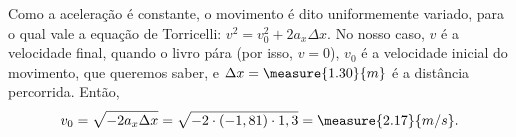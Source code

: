 \begin{question}
\begin{solution}
		Como a aceleração é constante, o movimento é dito uniformemente variado, para o qual vale a equação de Torricelli: $v^2 = v_0^2 + 2 a_x \Delta x$.
		No nosso caso, $v$ é a velocidade final, quando o livro pára (por isso, $v = 0$), $v_0$ é a velocidade inicial do movimento, que queremos saber, e $\Delta x = \measure{1.30}{m}$ é a distância percorrida.
		Então,
		\begin{equation*}
		v_0 = \sqrt{-2a_x\Delta x} = \sqrt{-2 \cdot (-1,81) \cdot 1,3} = \measure{2.17}{m/s}.
		\end{equation*}
	\end{solution}
\end{question}

\begin{comment}

```python
from math import *

def to_rad(angle):
	return (angle * pi / 180)

def exercicio_6(d, g, mu, angle):
	theta = to_rad(angle)
	return(sqrt(2*g*d*(sin(theta) + mu * cos(theta))))

```
\end{comment}